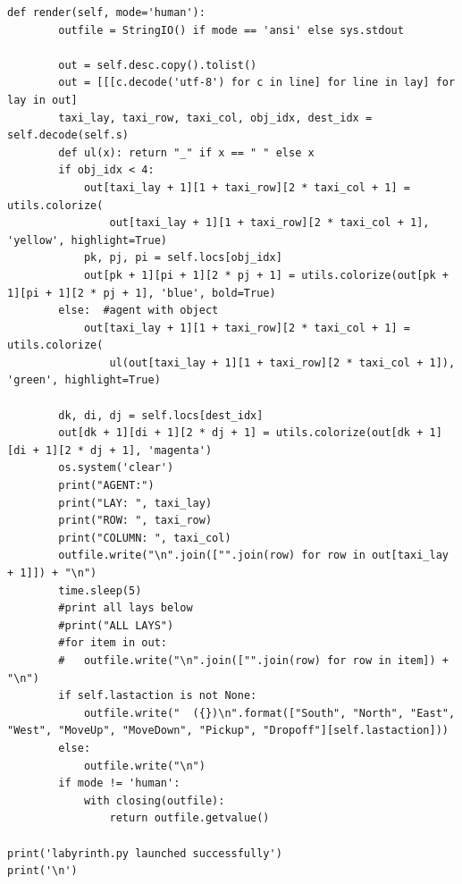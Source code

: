 \documentclass[a4paper]{report}
\theoremstyle{definition}
\theoremstyle{plain}
\theoremstyle{remark}
\theoremstyle{remark}
\theoremstyle{definition}
\begin{document}
\begin{lstlisting}[label=some-code, caption=labyrinth.py]
    def render(self, mode='human'):
        outfile = StringIO() if mode == 'ansi' else sys.stdout

        out = self.desc.copy().tolist()
        out = [[[c.decode('utf-8') for c in line] for line in lay] for lay in out]
        taxi_lay, taxi_row, taxi_col, obj_idx, dest_idx = self.decode(self.s)
        def ul(x): return "_" if x == " " else x
        if obj_idx < 4:
            out[taxi_lay + 1][1 + taxi_row][2 * taxi_col + 1] = utils.colorize(
                out[taxi_lay + 1][1 + taxi_row][2 * taxi_col + 1], 'yellow', highlight=True)
            pk, pj, pi = self.locs[obj_idx]
            out[pk + 1][pi + 1][2 * pj + 1] = utils.colorize(out[pk + 1][pi + 1][2 * pj + 1], 'blue', bold=True)
        else:  #agent with object
            out[taxi_lay + 1][1 + taxi_row][2 * taxi_col + 1] = utils.colorize(
                ul(out[taxi_lay + 1][1 + taxi_row][2 * taxi_col + 1]), 'green', highlight=True)

        dk, di, dj = self.locs[dest_idx]
        out[dk + 1][di + 1][2 * dj + 1] = utils.colorize(out[dk + 1][di + 1][2 * dj + 1], 'magenta')
        os.system('clear')
        print("AGENT:")
        print("LAY: ", taxi_lay)
        print("ROW: ", taxi_row)
        print("COLUMN: ", taxi_col)
        outfile.write("\n".join(["".join(row) for row in out[taxi_lay + 1]]) + "\n")
        time.sleep(5)
        #print all lays below
        #print("ALL LAYS")
        #for item in out:
        #   outfile.write("\n".join(["".join(row) for row in item]) + "\n")
        if self.lastaction is not None:
            outfile.write("  ({})\n".format(["South", "North", "East", "West", "MoveUp", "MoveDown", "Pickup", "Dropoff"][self.lastaction]))
        else:
            outfile.write("\n")
        if mode != 'human':
            with closing(outfile):
                return outfile.getvalue()

print('labyrinth.py launched successfully')
print('\n')
\end{lstlisting}
\end{document}
